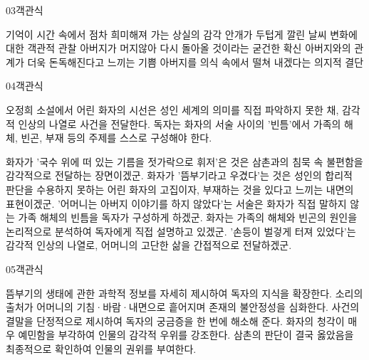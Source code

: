 \documentclass[fs85,seriesWit]{korfarm-base}
\begin{document}
\begin{kfQBlock}{03}{객관식}
\begin{kfChoices}
\kfChoice 기억이 시간 속에서 점차 희미해져 가는 상실의 감각
\kfChoice 안개가 두텁게 깔린 날씨 변화에 대한 객관적 관찰
\kfChoice 아버지가 머지않아 다시 돌아올 것이라는 굳건한 확신
\kfChoice 아버지와의 관계가 더욱 돈독해진다고 느끼는 기쁨
\kfChoice 아버지를 의식 속에서 떨쳐 내겠다는 의지적 결단
\end{kfChoices}
\end{kfQBlock}

\begin{kfQBlock}{04}{객관식}
\begin{kfEvidence}오정희 소설에서 어린 화자의 시선은 성인 세계의 의미를 직접 파악하지 못한 채, 감각적 인상의 나열로 사건을 전달한다. 독자는 화자의 서술 사이의 '빈틈'에서 가족의 해체, 빈곤, 부재 등의 주제를 스스로 구성해야 한다.\end{kfEvidence}
\begin{kfChoices}
\kfChoice 화자가 '국수 위에 떠 있는 기름을 젓가락으로 휘저'은 것은 삼촌과의 침묵 속 불편함을 감각적으로 전달하는 장면이겠군.
\kfChoice 화자가 '뜸부기라고 우겼다'는 것은 성인의 합리적 판단을 수용하지 못하는 어린 화자의 고집이자, 부재하는 것을 있다고 느끼는 내면의 표현이겠군.
\kfChoice '어머니는 아버지 이야기를 하지 않았다'는 서술은 화자가 직접 말하지 않는 가족 해체의 빈틈을 독자가 구성하게 하겠군.
\kfChoice 화자는 가족의 해체와 빈곤의 원인을 논리적으로 분석하여 독자에게 직접 설명하고 있겠군.
\kfChoice '손등이 벌겋게 터져 있었다'는 감각적 인상의 나열로, 어머니의 고단한 삶을 간접적으로 전달하겠군.
\end{kfChoices}
\end{kfQBlock}

\begin{kfQBlock}{05}{객관식}
\begin{kfChoices}
\kfChoice 뜸부기의 생태에 관한 과학적 정보를 자세히 제시하여 독자의 지식을 확장한다.
\kfChoice 소리의 출처가 어머니의 기침·바람·내면으로 흩어지며 존재의 불안정성을 심화한다.
\kfChoice 사건의 결말을 단정적으로 제시하여 독자의 궁금증을 한 번에 해소해 준다.
\kfChoice 화자의 청각이 매우 예민함을 부각하여 인물의 감각적 우위를 강조한다.
\kfChoice 삼촌의 판단이 결국 옳았음을 최종적으로 확인하여 인물의 권위를 부여한다.
\end{kfChoices}
\end{kfQBlock}
\end{document}

